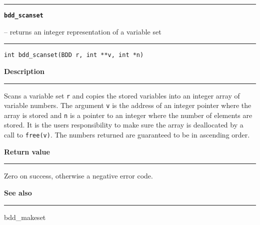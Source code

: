 \begin{minipage}{\textwidth}

\noindent\begin{minipage}{\textwidth}
\rule{\textwidth}{0.5mm}
{\tt\bf bdd\_scanset }
\--- returns an integer representation of a variable set  \hspace{\fill}
\\\rule[1.5ex]{\textwidth}{0.5mm}
\end{minipage}

\noindent\begin{verbatim}
int bdd_scanset(BDD r, int **v, int *n) 
\end{verbatim}

\vspace{\parsep}\noindent
{\bf Description}\\\rule[1.5ex]{\textwidth}{0.2mm}\vspace{-1.5ex}\setlength{\parindent}{1em}
Scans a variable set {\tt r} and copies the stored variables into
           an integer array of variable numbers. The argument {\tt v} is
	   the address of an integer pointer where the array is stored and
	   {\tt n} is a pointer to an integer where the number of elements
	   are stored. It is the users responsibility to make sure the
	   array is deallocated by a call to {\tt free(v)}. The numbers
	   returned are guaranteed to be in ascending order. 

\setlength{\parindent}{0em}\vspace{\parsep}\vspace{\baselineskip}\noindent
{\bf Return value}\\\rule[1.5ex]{\textwidth}{0.2mm}\vspace{-1.5ex}
Zero on success, otherwise a negative error code. 

\vspace{\parsep}\vspace{\baselineskip}\noindent
{\bf See also}\\\rule[1.5ex]{\textwidth}{0.2mm}\vspace{-1.5ex}
bdd\_makeset 
\end{minipage}
\vspace{8ex}
